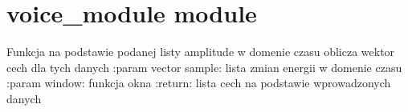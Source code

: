 \documentclass[letterpaper,10pt,polish]{sphinxmanual}
\begin{document}
\begin{fulllineitems}
\label{\detokenize{main:main.draw_energy_histogram}}
\end{fulllineitems}


\begin{fulllineitems}
\label{\detokenize{main:main.draw_freq_histogram}}
\end{fulllineitems}



\section{voice\_module module}
\label{\detokenize{voice_module:voice-module-module}}\label{\detokenize{voice_module::doc}}\label{\detokenize{voice_module:module-voice_module}}

\begin{fulllineitems}
\label{\detokenize{voice_module:voice_module.get_energy_feature_vector}}
Funkcja na podstawie podanej listy amplitude w domenie czasu oblicza wektor cech dla tych danych
:param vector sample: lista zmian energii w domenie czasu
:param window: funkcja okna
:return: lista cech na podstawie wprowadzonych danych

\end{fulllineitems}

\end{document}
